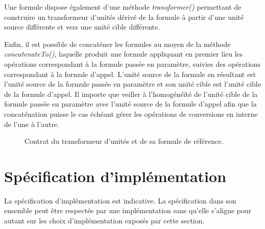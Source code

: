 \documentclass[a4paper,twoside,10pt]{article}
\begin{document}
Une formule dispose également d'une méthode \emph{transformer()} permettant de construire un transformeur d'unités
dérivé de la formule à partir d'une unité source différente et vers une unité cible différente.

Enfin, il est possible de concaténer les formules au moyen de la méthode \emph{concatenateTo()}, laquelle produit une
formule appliquant en premier lieu les opérations correspondant à la formule passée en paramètre, suivies des opérations
correspondant à la formule d'appel. L'unité source de la formule en résultant est l'unité source de la formule passée
en paramètre et son unité cible est l'unité cible de la formule d'appel. Il importe que veiller à l'homogénéïté de
l'unité cible de la formule passée en paramètre avec l'unité source de la formule d'appel afin que la concaténation
puisse le cas échéant gérer les opérations de conversions en interne de l'une à l'autre.

\begin{figure}[!h]
\caption{Contrat du transformeur d'unités et de sa formule de référence.}
\end{figure}


\section{Spécification d'implémentation}

La spécification d'implémentation est indicative. La spécification dans son ensemble peut être respectée par une
implémentation sans qu'elle s'aligne pour autant sur les choix d'implémentation exposés par cette section.
\end{document}
